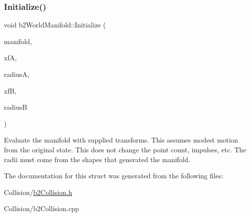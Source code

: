 \subsubsection{\texorpdfstring{Initialize()}{Initialize()}}
{\footnotesize\ttfamily void b2\+World\+Manifold\+::\+Initialize (\begin{DoxyParamCaption}\item[{const \mbox{\hyperlink{structb2Manifold}{b2\+Manifold}} $\ast$}]{manifold,  }\item[{const \mbox{\hyperlink{structb2Transform}{b2\+Transform}} \&}]{xfA,  }\item[{float32}]{radiusA,  }\item[{const \mbox{\hyperlink{structb2Transform}{b2\+Transform}} \&}]{xfB,  }\item[{float32}]{radiusB }\end{DoxyParamCaption})}

Evaluate the manifold with supplied transforms. This assumes modest motion from the original state. This does not change the point count, impulses, etc. The radii must come from the shapes that generated the manifold. 

The documentation for this struct was generated from the following files\+:\begin{DoxyCompactItemize}
\item 
Collision/\mbox{\hyperlink{b2Collision_8h}{b2\+Collision.\+h}}\item 
Collision/b2\+Collision.\+cpp\end{DoxyCompactItemize}
